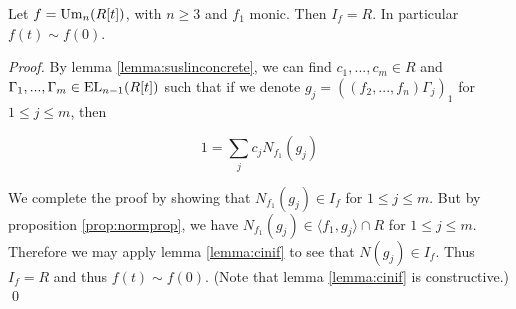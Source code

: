 \begin{lemma}
  Let $f = \text{Um}_n(R[t])$, with $n \geq 3$ and $f_1$ monic.
  Then $I_f = R$. In particular $f(t) \sim f(0)$.
\end{lemma}
\begin{proof}
  By lemma \ref{lemma:suslinconcrete}, we can find $c_1, ..., c_m \in R$ and $\Gamma_1, ..., \Gamma_m \in \text{EL}_{n-1}(R[t])$ such that
  if we denote $g_j = ((f_2, ..., f_n) \Gamma_j)_1$ for $1 \leq j \leq m$, then

  \[
    1 = \sum_j c_j N_{f_1}(g_j)
  \]

  We complete the proof by showing that $N_{f_1}(g_j) \in I_f$ for $1 \leq j \leq m$.
  But by proposition \ref{prop:normprop}, we have $N_{f_1}(g_j) \in \langle f_1, g_j \rangle \cap R$ for $1 \leq j \leq m$.
  Therefore we may apply lemma \ref{lemma:cinif} to see that $N(g_j) \in I_f$.
  Thus $I_f = R$ and thus $f(t) \sim f(0)$.
  (Note that lemma \ref{lemma:cinif} is constructive.)
  \qed
\end{proof}
